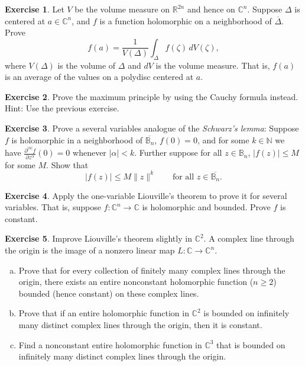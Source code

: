 \documentclass[12pt,openany]{book}
\newcommand{\sabs}[1]{\lvert {#1} \rvert}
\newcommand{\snorm}[1]{\lVert {#1} \rVert}
\newcommand{\C}{{\mathbb{C}}}
\newcommand{\R}{{\mathbb{R}}}
\newcommand{\N}{{\mathbb{N}}}
\newcommand{\bB}{{\mathbb{B}}}
\newcommand{\myindex}[1]{#1\index{#1}}
\theoremstyle{plain}
\theoremstyle{remark}
\theoremstyle{definition}
\newenvironment{exbox}{%
    \def\FrameCommand{\vrule width 1pt \relax\hspace{10pt}}%
    \MakeFramed{\advance\hsize-\width\FrameRestore}%
}{%
    \endMakeFramed
}
\newenvironment{exparts}{%
    \leavevmode\begin{enumerate}[a),noitemsep,topsep=0pt,parsep=0pt,partopsep=0pt]
}{%
    \end{enumerate}
}
\theoremstyle{exercise}
\newtheorem{exercise}{Exercise}[section]
\theoremstyle{example}
\begin{document}
\begin{exbox}
\begin{exercise} \label{exercise:averageDelta}
Let $V$ be the volume measure on $\R^{2n}$ and hence on $\C^n$.
Suppose $\Delta$ is centered at $a \in \C^n$, and $f$ is a function holomorphic on
a neighborhood of $\overline{\Delta}$.  Prove
\begin{equation*}
f(a) =
\frac{1}{V(\Delta)}
\int_{\Delta} f(\zeta) \, dV(\zeta) ,
\end{equation*}
where $V(\Delta)$ is the volume of $\Delta$ and $dV$ is the volume measure.
That is, $f(a)$ is an average of the values on a polydisc centered at $a$.
\end{exercise}

\begin{exercise}
Prove the maximum principle by using the Cauchy formula instead.  Hint:
Use the previous exercise.
\end{exercise}

\begin{exercise}
Prove a several variables analogue of the \emph{\myindex{Schwarz's lemma}}:
Suppose $f$ is holomorphic in a neighborhood of $\overline{\bB_n}$,
$f(0) = 0$, and for some $k \in \N$ we have
$\frac{\partial^{\sabs{\alpha}} f}{\partial z^\alpha} (0) =
0$ whenever $\sabs{\alpha} < k$.  Further suppose
for all $z \in \bB_n$,
$\sabs{f(z)} \leq M$ for some $M$.  Show that
\begin{equation*}
\sabs{f(z)} \leq M \snorm{z}^k
\qquad
\text{for all $z \in \overline{\bB_n}$}.
\end{equation*}
\end{exercise}

\begin{exercise}
Apply the one-variable Liouville's theorem to prove it for several variables.
That is, suppose $f \colon \C^n \to \C$ is holomorphic and bounded.
Prove $f$ is constant.
\end{exercise}

\begin{exercise}
\pagebreak[2]
Improve Liouville's theorem slightly in $\C^2$.
A complex line through the origin is
the image of a nonzero linear map $L \colon \C \to \C^n$.
\begin{exparts}
\item
Prove that
for every collection of finitely many complex lines through the origin,
there exists an entire nonconstant holomorphic function ($n \geq 2$)
bounded (hence constant) on these complex lines.
\item
Prove that if an entire holomorphic function in $\C^2$ is bounded on
infinitely many distinct
complex lines through the origin, then it is constant.
\item
Find a nonconstant entire holomorphic function in $\C^3$ that is
bounded on
infinitely many distinct
complex lines through the origin.
\end{exparts}
\end{exercise}


\end{exbox}
\end{document}
